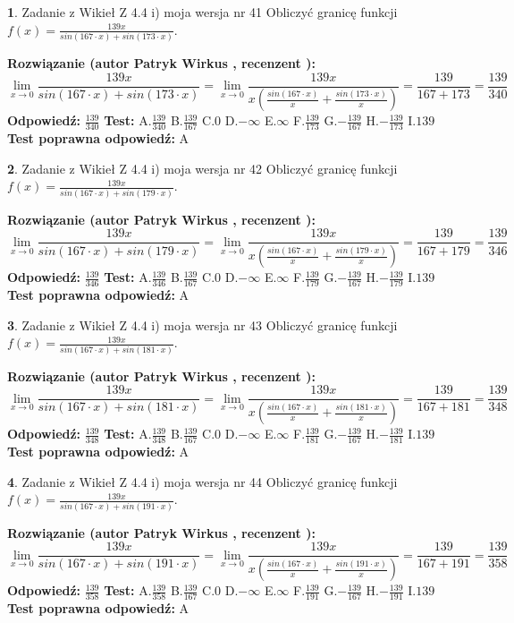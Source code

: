\documentclass[12pt, a4paper]{article}
\theoremstyle{definition} %
\newtheorem{zad}{}
\newcommand{\zadStart}[1]{\begin{zad}#1\newline}
\newcommand{\zadStop}{\end{zad}}
\newcommand{\rozwStart}[2]{\noindent \textbf{Rozwiązanie (autor #1 , recenzent #2): }\newline}
\newcommand{\rozwStop}{\newline}
\newcommand{\odpStart}{\noindent \textbf{Odpowiedź:}\newline}
\newcommand{\odpStop}{\newline}
\newcommand{\testStart}{\noindent \textbf{Test:}\newline}
\newcommand{\testStop}{\newline}
\newcommand{\kluczStart}{\noindent \textbf{Test poprawna odpowiedź:}\newline}
\newcommand{\kluczStop}{\newline}
\begin{document}
\zadStart{Zadanie z Wikieł Z 4.4 i) moja wersja nr 41}
Obliczyć granicę funkcji $f(x)=\frac{139x}{sin(167\cdot x) +sin(173\cdot x)}$.
\zadStop
\rozwStart{Patryk Wirkus}{}
$$\lim\limits_{x\to 0}\frac{139x}{sin(167\cdot x) +sin(173\cdot x)}=\lim\limits_{x\to 0}\frac{139x}{x(\frac{sin(167\cdot x)}{x}+\frac{sin(173\cdot x)}{x})}=\frac{139}{167+173} = \frac{139}{340}$$
\rozwStop
\odpStart
$\frac{139}{340}$
\odpStop
\testStart
A.$\frac{139}{340}$
B.$\frac{139}{167}$
C.$0$
D.$-\infty$
E.$\infty$
F.$\frac{139}{173}$
G.$-\frac{139}{167}$
H.$-\frac{139}{173}$
I.$139$
\testStop
\kluczStart
A
\kluczStop



\zadStart{Zadanie z Wikieł Z 4.4 i) moja wersja nr 42}
Obliczyć granicę funkcji $f(x)=\frac{139x}{sin(167\cdot x) +sin(179\cdot x)}$.
\zadStop
\rozwStart{Patryk Wirkus}{}
$$\lim\limits_{x\to 0}\frac{139x}{sin(167\cdot x) +sin(179\cdot x)}=\lim\limits_{x\to 0}\frac{139x}{x(\frac{sin(167\cdot x)}{x}+\frac{sin(179\cdot x)}{x})}=\frac{139}{167+179} = \frac{139}{346}$$
\rozwStop
\odpStart
$\frac{139}{346}$
\odpStop
\testStart
A.$\frac{139}{346}$
B.$\frac{139}{167}$
C.$0$
D.$-\infty$
E.$\infty$
F.$\frac{139}{179}$
G.$-\frac{139}{167}$
H.$-\frac{139}{179}$
I.$139$
\testStop
\kluczStart
A
\kluczStop



\zadStart{Zadanie z Wikieł Z 4.4 i) moja wersja nr 43}
Obliczyć granicę funkcji $f(x)=\frac{139x}{sin(167\cdot x) +sin(181\cdot x)}$.
\zadStop
\rozwStart{Patryk Wirkus}{}
$$\lim\limits_{x\to 0}\frac{139x}{sin(167\cdot x) +sin(181\cdot x)}=\lim\limits_{x\to 0}\frac{139x}{x(\frac{sin(167\cdot x)}{x}+\frac{sin(181\cdot x)}{x})}=\frac{139}{167+181} = \frac{139}{348}$$
\rozwStop
\odpStart
$\frac{139}{348}$
\odpStop
\testStart
A.$\frac{139}{348}$
B.$\frac{139}{167}$
C.$0$
D.$-\infty$
E.$\infty$
F.$\frac{139}{181}$
G.$-\frac{139}{167}$
H.$-\frac{139}{181}$
I.$139$
\testStop
\kluczStart
A
\kluczStop



\zadStart{Zadanie z Wikieł Z 4.4 i) moja wersja nr 44}
Obliczyć granicę funkcji $f(x)=\frac{139x}{sin(167\cdot x) +sin(191\cdot x)}$.
\zadStop
\rozwStart{Patryk Wirkus}{}
$$\lim\limits_{x\to 0}\frac{139x}{sin(167\cdot x) +sin(191\cdot x)}=\lim\limits_{x\to 0}\frac{139x}{x(\frac{sin(167\cdot x)}{x}+\frac{sin(191\cdot x)}{x})}=\frac{139}{167+191} = \frac{139}{358}$$
\rozwStop
\odpStart
$\frac{139}{358}$
\odpStop
\testStart
A.$\frac{139}{358}$
B.$\frac{139}{167}$
C.$0$
D.$-\infty$
E.$\infty$
F.$\frac{139}{191}$
G.$-\frac{139}{167}$
H.$-\frac{139}{191}$
I.$139$
\testStop
\kluczStart
A
\kluczStop
\end{document}
